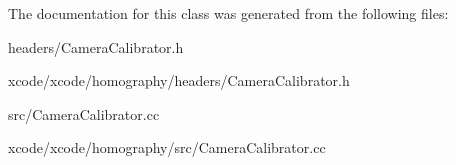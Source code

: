 The documentation for this class was generated from the following files\-:\begin{DoxyCompactItemize}
\item 
headers/Camera\-Calibrator.\-h\item 
xcode/xcode/homography/headers/Camera\-Calibrator.\-h\item 
src/Camera\-Calibrator.\-cc\item 
xcode/xcode/homography/src/Camera\-Calibrator.\-cc\end{DoxyCompactItemize}
